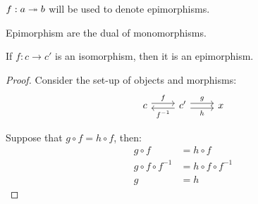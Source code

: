 \begin{remark}
  $f:a\twoheadrightarrow b$ will be used to denote epimorphisms.
\end{remark}

\begin{remark}
  Epimorphism are the dual of monomorphisms.
\end{remark}

\begin{theorem}
  If $f:c\to c'$ is an isomorphism, then it is an epimorphism.

  \begin{proof}
    Consider the set-up of objects and morphisms:
    \[\begin{tikzcd}[ampersand replacement=\&]
      c \& {c'} \& x
      \arrow["f", shift left=1, from=1-1, to=1-2]
      \arrow["{f^{-1}}", shift left=1, from=1-2, to=1-1]
      \arrow["g", shift left=1, from=1-2, to=1-3]
      \arrow["h"', shift right=1, from=1-2, to=1-3]
    \end{tikzcd}\]

    Suppose that $g \circ f = h \circ f$, then:
    \[
      \begin{aligned}
        g \circ f &= h \circ f\\
        g \circ f \circ f^{-1} &= h \circ f \circ f^{-1}\\
        g &= h
      \end{aligned}
    \]
  \end{proof}
\end{theorem}